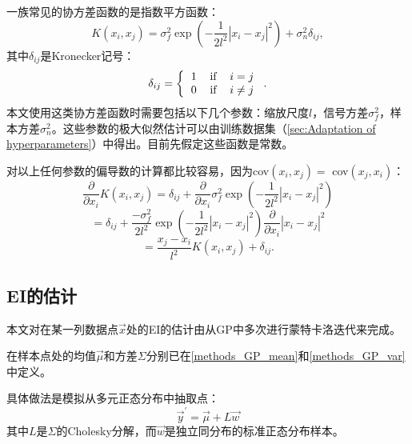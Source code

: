 \documentclass[index]{subfiles}
\begin{document}
一族常见的协方差函数的是指数平方函数：
\begin{equation}
    K(x_{i}, x_{j}) = \sigma_{f}^{2}\exp\left( -\frac{1}{2l^{2}} |x_{i} - x_{j}|^{2}\right)  + \sigma_{n}^{2}\delta_{ij},
\end{equation}
其中$\delta_{ij}$是Kronecker记号：
\begin{equation}
    \delta_{ij} = \left\{ \begin{tabular}{ccc}
        1 & if & $i=j$ \\
        0 & if & $i\neq j$
    \end{tabular} \right..
\end{equation}
本文使用这类协方差函数时需要包括以下几个参数：缩放尺度$l$，信号方差$\sigma_{f}^{2}$，样本方差$\sigma_{n}^{2}$。这些参数的极大似然估计可以由训练数据集（\cref{sec:Adaptation of hyperparameters}）中得出。目前先假定这些函数是常数。

对以上任何参数的偏导数的计算都比较容易，因为cov$(x_{i}, x_{j}) = $ cov$(x_{j}, x_{i})$：
\begin{equation}
    \frac{\partial}{\partial x_{i}} K(x_{i}, x_{j}) = \delta_{ij} + \frac{\partial}{\partial x_{i}} \sigma_{f}^{2} \exp\left( - \frac{1}{2l^{2}} |x_{i} - x_{j}|^{2}\right)
\end{equation}
\begin{equation}
    =  \delta_{ij} + \frac{-\sigma_{f}^{2}}{2l^{2}} \exp\left( - \frac{1}{2l^{2}} |x_{i} - x_{j}|^{2}\right) \frac{\partial}{\partial x_{i}} |x_{i} - x_{j}|^{2}
\end{equation}
\begin{equation}
    =  \frac{x_{j} - x_{i}}{l^{2}} K(x_{i}, x_{j}) + \delta_{ij}.
\end{equation}

\subsection{EI的估计}
\label{estEI}

本文对在某一列数据点$\vec{x}$处的EI的估计由从GP中多次进行蒙特卡洛迭代来完成。

在样本点处的均值$\vec{\mu}$和方差$\Sigma$分别已在\cref{methods_GP_mean}和\cref{methods_GP_var}中定义。

具体做法是模拟从多元正态分布中抽取点：
\begin{equation}
    \vec{y}^{\prime} = \vec{\mu} + L \vec{w}
\end{equation}
其中$L$是$\Sigma$的Cholesky分解，而$\vec{w}$是独立同分布的标准正态分布样本。
\end{document}

